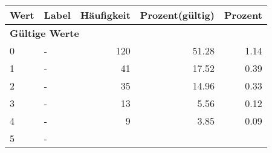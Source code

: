      \begin{longtable}{lXrrr}
     \toprule
     \textbf{Wert} & \textbf{Label} & \textbf{Häufigkeit} & \textbf{Prozent(gültig)} & \textbf{Prozent} \\
     \endhead
     \midrule
     \multicolumn{5}{l}{\textbf{Gültige Werte}}\\

     0 &
     \multicolumn{1}{X}{ -  } &


       \num{120} &
       \num[round-mode=places,round-precision=2]{51.28} &
         \num[round-mode=places,round-precision=2]{1.14} \\

     1 &
     \multicolumn{1}{X}{ -  } &


       \num{41} &
       \num[round-mode=places,round-precision=2]{17.52} &
         \num[round-mode=places,round-precision=2]{0.39} \\

     2 &
     \multicolumn{1}{X}{ -  } &


       \num{35} &
       \num[round-mode=places,round-precision=2]{14.96} &
         \num[round-mode=places,round-precision=2]{0.33} \\

     3 &
     \multicolumn{1}{X}{ -  } &


       \num{13} &
       \num[round-mode=places,round-precision=2]{5.56} &
         \num[round-mode=places,round-precision=2]{0.12} \\

     4 &
     \multicolumn{1}{X}{ -  } &


       \num{9} &
       \num[round-mode=places,round-precision=2]{3.85} &
         \num[round-mode=places,round-precision=2]{0.09} \\

     5 &
     \multicolumn{1}{X}{ -  } &



\end{longtable}
